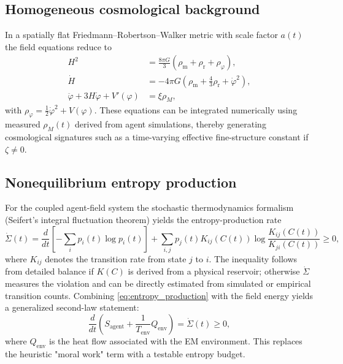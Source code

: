 \documentclass[12pt,a4paper]{article}
\theoremstyle{definition}
\begin{document}
\subsection{Homogeneous cosmological background}

In a spatially flat Friedmann--Robertson--Walker metric with scale factor $a(t)$ the field equations reduce to
\begin{align}
H^2 &= \frac{8\pi G}{3} \left(\rho_{\text{m}} + \rho_{\text{r}} + \rho_\varphi \right), \\
\dot{H} &= -4\pi G \left(\rho_{\text{m}} + \frac{4}{3} \rho_{\text{r}} + \dot{\varphi}^2 \right), \\
\ddot{\varphi} + 3 H \dot{\varphi} + V'(\varphi) &= \xi \rho_M,
\end{align}
with $\rho_\varphi = \frac{1}{2} \dot{\varphi}^2 + V(\varphi)$. These equations can be integrated numerically using measured $\rho_M(t)$ derived from agent simulations, thereby generating cosmological signatures such as a time-varying effective fine-structure constant if $\zeta \neq 0$.

\subsection{Nonequilibrium entropy production}

For the coupled agent-field system the stochastic thermodynamics formalism (Seifert's integral fluctuation theorem\cite{Seifert2012}) yields the entropy-production rate
\begin{equation}
\label{eq:entropy_production}
\dot{\Sigma}(t) = \frac{d}{dt} \left[-\sum_i p_i(t) \log p_i(t) \right] + \sum_{i,j} p_j(t) K_{ij}(C(t)) \log \frac{K_{ij}(C(t))}{K_{ji}(C(t))} \geq 0,
\end{equation}
where $K_{ij}$ denotes the transition rate from state $j$ to $i$. The inequality follows from detailed balance if $K(C)$ is derived from a physical reservoir; otherwise $\dot{\Sigma}$ measures the violation and can be directly estimated from simulated or empirical transition counts. Combining \eqref{eq:entropy_production} with the field energy yields a generalized second-law statement:
\begin{equation}
\frac{d}{dt} \left(S_{\text{agent}} + \frac{1}{T_{\text{env}}} Q_{\text{env}} \right) = \dot{\Sigma}(t) \geq 0,
\end{equation}
where $Q_{\text{env}}$ is the heat flow associated with the EM environment. This replaces the heuristic "moral work" term with a testable entropy budget.
\end{document}
